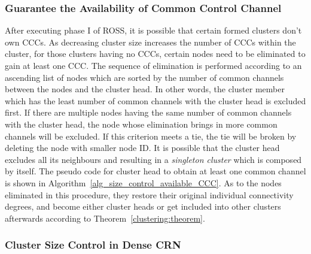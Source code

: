 \documentclass[10pt,journal,compsoc]{IEEEtran}
\theoremstyle{mytheoremstyle}
\theoremstyle{mytheoremstyle}
\theoremstyle{mytheoremstyle}
\newcommand{\ie}{i.e., }
\begin{document}
\subsubsection{Guarantee the Availability of Common Control Channel}
After executing phase I of ROSS, it is possible that certain formed clusters don't own CCCs.
%
As decreasing cluster size increases the number of CCCs within the cluster, for those clusters having no CCCs, certain nodes need to be eliminated to gain at least one CCC.
The sequence of elimination is performed according to an ascending list of nodes which are sorted by the number of common channels between the nodes and the cluster head. 
In other words, the cluster member which has the least number of common channels with the cluster head is excluded first.
If there are multiple nodes having the same number of common channels with the cluster head, the node whose elimination brings in more common channels will be excluded.
If this criterion meets a tie, the tie will be broken by deleting the node with smaller node ID.
It is possible that the cluster head excludes all its neighbours and resulting in a \textit{singleton cluster} which is composed by itself.
The pseudo code for cluster head to obtain at least one common channel is shown in Algorithm~\ref{alg_size_control_available_CCC}.
As to the nodes eliminated in this procedure, they restore their original individual connectivity degrees, and become either cluster heads or get included into other clusters afterwards according to Theorem~\ref{clustering:theorem}.




\subsubsection{Cluster Size Control in Dense CRN}
\label{cluster_pruning}
\end{document}
